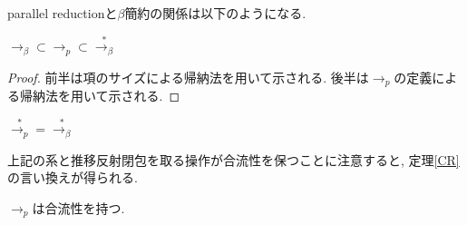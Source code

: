 \documentclass[12pt]{ltjsarticle}
\begin{document}
parallel reductionと$\beta$簡約の関係は以下のようになる.

\begin{lem}
 $\rightarrow_{\beta} \subset \rightarrow_{p} \subset \overset{*}{\rightarrow_{\beta}}$
\end{lem}

\begin{proof}
 前半は項のサイズによる帰納法を用いて示される. 後半は$\rightarrow_{p}$の定義による帰納法を用いて示される.
\end{proof}

\begin{cor}
 $\overset{*}{\rightarrow_{p}} = \overset{*}{\rightarrow_{\beta}}$
\end{cor}

上記の系と推移反射閉包を取る操作が合流性を保つことに注意すると, 定理\ref{CR}の言い換えが得られる.

\begin{thm}\label{CR'}
 $\rightarrow_{p}$は合流性を持つ.
\end{thm}
\end{document}

